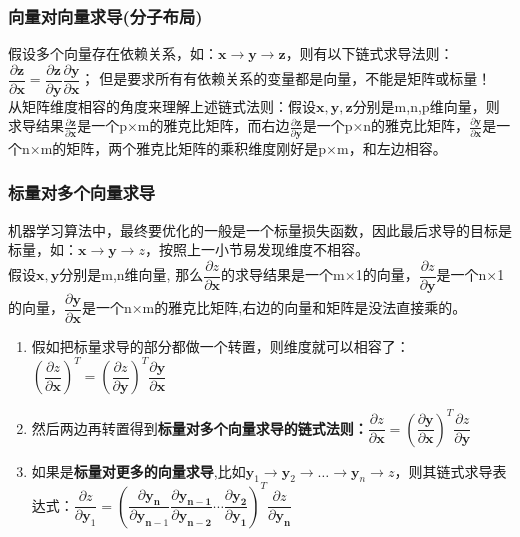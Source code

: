 \documentclass[UTF8]{article}
\begin{document}
    \subsubsection{向量对向量求导(分子布局)}
    假设多个向量存在依赖关系，如：$\mathbf{x} \rightarrow \mathbf{y} \rightarrow \mathbf{z}$，则有以下链式求导法则：$\dfrac{\partial \mathbf{z}}{\partial \mathbf{x}}=\dfrac{\partial \mathbf{z}}{\partial \mathbf{y}} \dfrac{\partial \mathbf{y}}{\partial \mathbf{x}}$；
    但是要求所有有依赖关系的变量都是向量，不能是矩阵或标量！
    \\
    从矩阵维度相容的角度来理解上述链式法则：假设$\mathbf{x}, \mathbf{y}, \mathbf{z}$分别是m,n,p维向量，则求导结果$\frac{\partial \mathbf{z}}{\partial \mathbf{x}}$是一个p×m的雅克比矩阵，而右边$\frac{\partial \mathbf{z}}{\partial \mathbf{y}}$是一个p×n的雅克比矩阵，$\frac{\partial \mathbf{y}}{\partial \mathbf{x}}$是一个n×m的矩阵，两个雅克比矩阵的乘积维度刚好是p×m，和左边相容。

    \subsubsection{标量对多个向量求导}
    机器学习算法中，最终要优化的一般是一个标量损失函数，因此最后求导的目标是标量，如：$\mathbf{x} \rightarrow \mathbf{y} \rightarrow z$，按照上一小节易发现维度不相容。
    \\
    假设$\bm{x,y}$分别是m,n维向量, 那么$\dfrac{\partial z}{\partial \bm{x}}$的求导结果是一个m×1的向量，$\dfrac{\partial z}{\partial \bm{y}}$是一个n×1的向量，$\dfrac{\partial \mathbf{y}}{\partial \mathbf{x}}$是一个n×m的雅克比矩阵,右边的向量和矩阵是没法直接乘的。
    \\
    \begin{enumerate}
        \item 假如把标量求导的部分都做一个转置，则维度就可以相容了：$\left(\dfrac{\partial z}{\partial \mathbf{x}}\right)^{T}=\left(\dfrac{\partial z}{\partial \mathbf{y}}\right)^{T} \dfrac{\partial \mathbf{y}}{\partial \mathbf{x}}$
        \item 然后两边再转置得到\textbf{标量对多个向量求导的链式法则：}$\dfrac{\partial z}{\partial \mathbf{x}}=\left(\dfrac{\partial \mathbf{y}}{\partial \mathbf{x}}\right)^{T} \dfrac{\partial z}{\partial \mathbf{y}}$
        \item 如果是\textbf{标量对更多的向量求导},比如$\mathbf{y}_{1} \rightarrow \mathbf{y}_{2} \rightarrow \ldots \rightarrow \mathbf{y}_{n} \rightarrow z$，则其链式求导表达式：$\dfrac{\partial z}{\partial \mathbf{y}_{1}}=\left(\dfrac{\partial \mathbf{y}_{\mathbf{n}}}{\partial \mathbf{y}_{\mathbf{n}-1}} \dfrac{\partial \mathbf{y}_{\mathbf{n}-\mathbf{1}}}{\partial \mathbf{y}_{\mathbf{n}-\mathbf{2}}} \cdots \dfrac{\partial \mathbf{y}_{\mathbf{2}}}{\partial \mathbf{y}_{\mathbf{1}}}\right)^{T} \dfrac{\partial z}{\partial \mathbf{y}_{\mathbf{n}}}$
    \end{enumerate}
\end{document}
